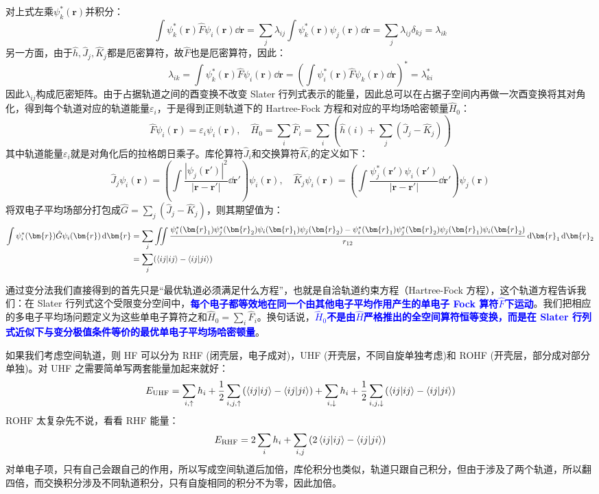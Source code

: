 对上式左乘$\psi_k^*(\bm{r})$并积分：
\[\int \psi_k^*(\bm{r})\hat{F}\psi_i(\bm{r})\dd{\bm{r}}=\sum_j\lambda_{ij}\int \psi_k^*(\bm{r})\psi_j(\bm{r})\dd{\bm{r}}=\sum_j\lambda_{ij}\delta_{kj}=\lambda_{ik}\]
另一方面，由于$\hat{h},\hat{J}_j,\hat{K}_j$都是厄密算符，故$\hat{F}$也是厄密算符，因此：
\[\lambda_{ik}=\int \psi_k^*(\bm{r})\hat{F}\psi_i(\bm{r})\dd{\bm{r}}=\left(\int \psi_i^*(\bm{r})\hat{F}\psi_k(\bm{r})\dd{\bm{r}}\right)^*=\lambda_{ki}^*\]
因此$\lambda_{ij}$构成厄密矩阵。由于占据轨道之间的酉变换不改变 Slater 行列式表示的能量，因此总可以在占据子空间内再做一次酉变换将其对角化，得到每个轨道对应的轨道能量$\varepsilon_i$，于是得到正则轨道下的 Hartree-Fock 方程和对应的平均场哈密顿量$\hat{H}_0$：
\[\hat{F}\psi_i(\bm{r})=\varepsilon_i\psi_i(\bm{r}), \quad \hat{H}_0=\sum_i\hat{F}_i=\sum_i\left(\hat{h}(i)+\sum_j(\hat{J}_j-\hat{K}_j)\right)\]
其中轨道能量$\varepsilon_i$就是对角化后的拉格朗日乘子。库伦算符$\hat{J}_i$和交换算符$\hat{K}_i$的定义如下：
\[\hat{J}_j\psi_i(\bm{r})=\left(\int\frac{|\psi_j(\bm{r}')|^2}{|\bm{r}-\bm{r}'|}\dd{\bm{r}'}\right)\psi_i(\bm{r}), \quad \hat{K}_j\psi_i(\bm{r})=\left(\int\frac{\psi_j^*(\bm{r}')\psi_i(\bm{r}')}{|\bm{r}-\bm{r}'|}\dd{\bm{r}'}\right)\psi_j(\bm{r})\]
将双电子平均场部分打包成$\hat{G}=\sum_j(\hat{J}_j-\hat{K}_j)$，则其期望值为：
\[\begin{aligned}
\int \psi_i^*(\bm{r})\hat{G}\psi_i(\bm{r})\dd{\bm{r}}&=\sum_j\iint\frac{\psi_i^*(\bm{r}_1)\psi_j^*(\bm{r}_2)\psi_i(\bm{r}_1)\psi_j(\bm{r}_2)-\psi_i^*(\bm{r}_1)\psi_j^*(\bm{r}_2)\psi_j(\bm{r}_1)\psi_i(\bm{r}_2)}{r_{12}}\dd{\bm{r}_1}\dd{\bm{r}_2}\\
&=\sum_{j}(\bra{ij}\ket{ij}-\bra{ij}\ket{ji})
\end{aligned}\]

通过变分法我们直接得到的首先只是“最优轨道必须满足什么方程”，也就是自洽轨道约束方程（Hartree-Fock 方程），这个轨道方程告诉我们：在 Slater 行列式这个受限变分空间中，\textcolor{blue}{\textbf{每个电子都等效地在同一个由其他电子平均作用产生的单电子 Fock 算符$\hat{F}$下运动}}。我们把相应的多电子平均场问题定义为这些单电子算符之和$\hat{H}_0=\sum_i\hat{F}_i$。换句话说，\textcolor{blue}{\textbf{$\hat{H}_0$不是由$\hat{H}$严格推出的全空间算符恒等变换，而是在 Slater 行列式近似下与变分极值条件等价的最优单电子平均场哈密顿量}}。

如果我们考虑空间轨道，则 HF 可以分为 RHF (闭壳层，电子成对)，UHF (开壳层，不同自旋单独考虑)和 ROHF (开壳层，部分成对部分单独)。对 UHF 之需要简单写两套能量加起来就好：
\[E_{\rm{UHF}}=\sum_{i,\uparrow}h_i+\frac{1}{2}\sum_{i,j,\uparrow}\left(\bra{ij}\ket{ij}-\bra{ij}\ket{ji}\right)+\sum_{i,\downarrow}h_i+\frac{1}{2}\sum_{i,j,\downarrow}\left(\bra{ij}\ket{ij}-\bra{ij}\ket{ji}\right)\]
ROHF 太复杂先不说，看看 RHF 能量：
\[E_{\rm{RHF}}=2\sum_ih_i+\sum_{i,j}\left(2\bra{ij}\ket{ij}-\bra{ij}\ket{ji}\right)\]
对单电子项，只有自己会跟自己的作用，所以写成空间轨道后加倍，库伦积分也类似，轨道只跟自己积分，但由于涉及了两个轨道，所以翻四倍，而交换积分涉及不同轨道积分，只有自旋相同的积分不为零，因此加倍。

